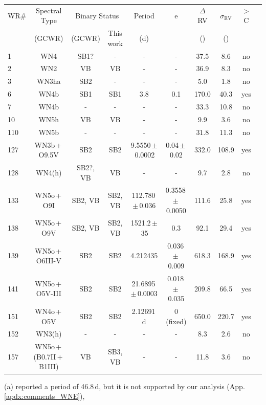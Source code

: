 \begin{table}
\begin{threeparttable}
\begin{tabular*}{\textwidth}{l @{\extracolsep{\fill}}*{9}{c}}
WR\# & Spectral Type & \multicolumn{2}{c}{Binary Status} & Period & e & $\Delta$ RV  & $\sigma_{\textrm{RV}}$ & \DelRV{} $>$ C\\ 
 & (GCWR) & (GCWR) & This work & (d) & &(\kms{}) &(\kms{}) &  \\ \midrule 
1 & WN4 & SB1? & - & - & - & 37.5 & 8.6 & no\\
2 & WN2 & VB & VB\tnote{(l)} & - & - & 36.9 & 8.3 & no\\
3 & WN3ha & SB2 & - & -\tnote{(a)} & - & 5.0 & 1.8 & no\\
6 & WN4b & SB1 & SB1 & 3.8\tnote{(b)} & 0.1\tnote{(b)} & 170.0 & 40.3 & yes\\
7 & WN4b & - & - & - & - & 33.3 & 10.8 & no\\
10 & WN5h & VB & VB\tnote{(l)} & - & - & 9.9 & 3.6 & no\\
110 & WN5b & - & - & - & - & 31.8 & 11.3 & no\\
127 & WN3b\,+\,O9.5V & SB2 & SB2 & 9.5550\,$\pm$\,0.0002\tnote{(c)} & 0.04\,$\pm$\,0.02\tnote{(c)} & 332.0 & 108.9 & yes\\
128 & WN4(h) & SB2?, VB & VB\tnote{(l)} & - & - & 9.7 & 2.8 & no\\
133 & WN5o\,+\,O9I & SB2, VB & SB2, VB\tnote{(l)} & 112.780\,$\pm$\,0.036\tnote{(d)} & 0.3558\,$\pm$\,0.0050\tnote{(d)} & 111.6 & 25.8 & yes\\
138 & WN5o\,+\,O9V\tnote{(e)} & SB2, VB & SB2, VB\tnote{(l)} & 1521.2\,$\pm$\,35\tnote{(f)} & 0.3\tnote{(g)} & 92.1 & 29.4 & yes\\
139 & WN5o\,+\,O6III-V & SB2 & SB2 & 4.212435\tnote{(h)} & 0.036\,$\pm$\,0.009\tnote{(h)} & 618.3 & 168.9 & yes\\
141 & WN5o\,+\,O5V-III & SB2 & SB2 & 21.6895\,$\pm$\,0.0003\tnote{(i)} & 0.018\,$\pm$\,0.035\tnote{(i)} & 209.8 & 66.5 & yes\\
151 & WN4o\,+\,O5V & SB2 & SB2 & 2.12691\,d\tnote{(j)} & 0 (fixed)\tnote{(j)} & 650.0 & 220.7 & yes\\
152 & WN3(h) & - & - & - & - & 8.3 & 2.6 & no\\
157 & WN5o\,+\,(B0.7II\,+\,B1III)\tnote{(k)} & VB & SB3, VB\tnote{(l)} & - & - & 11.8 & 3.6 & no\\
\bottomrule
\end{tabular*}
\begin{tablenotes}
   \item[(a)] \citet{1986Moffat+abs} reported a period of 46.8\,d, but it is not supported by our analysis (App. \ref{apdx:comments_WNE}), 

\end{tablenotes}
\end{threeparttable}
\end{table}
